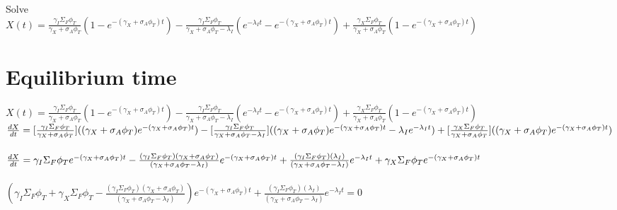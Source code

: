 \documentclass[11pt,a4paper]{article}
\begin{document}
\noindent Solve \\
$X(t)=\frac{\gamma_I\Sigma_F\phi_T}{\gamma_X+\sigma_A\phi_T}(1-e^{-(\gamma_X+\sigma_A\phi_T)t})-\frac{\gamma_I\Sigma_F\phi_T}{\gamma_X+\sigma_A\phi_T-\lambda_I}(e^{-\lambda_I t}-e^{-(\gamma_X+\sigma_A\phi_T)t})+\frac{\gamma_X\Sigma_F\phi_T}{\gamma_X+\sigma_A\phi_T}(1-e^{-(\gamma_X+\sigma_A\phi_T)t})$ \\

\newpage

\section{Equilibrium time}
$X(t)=\frac{\gamma_I\Sigma_F\phi_T}{\gamma_X+\sigma_A\phi_T}(1-e^{-(\gamma_X+\sigma_A\phi_T)t})-\frac{\gamma_I\Sigma_F\phi_T}{\gamma_X+\sigma_A\phi_T-\lambda_I}(e^{-\lambda_I t}-e^{-(\gamma_X+\sigma_A\phi_T)t})+\frac{\gamma_X\Sigma_F\phi_T}{\gamma_X+\sigma_A\phi_T}(1-e^{-(\gamma_X+\sigma_A\phi_T)t})$ \\

\noindent $\frac{dX}{dt}=[\frac{\gamma_I\Sigma_F\phi_T}{\gamma_X+\sigma_A\phi_T}]((\gamma_X+\sigma_A\phi_T)e^{-(\gamma_X+\sigma_A\phi_T)t})-[\frac{\gamma_I\Sigma_F\phi_T}{\gamma_X+\sigma_A\phi_T-\lambda_I}]((\gamma_X+\sigma_A\phi_T)e^{-(\gamma_X+\sigma_A\phi_T)t}-\lambda_Ie^{-\lambda_I t}) \\ +[\frac{\gamma_X\Sigma_F\phi_T}{\gamma_X+\sigma_A\phi_T}]((\gamma_X+\sigma_A\phi_T)e^{-(\gamma_X+\sigma_A\phi_T)t})$ \\ \\

\noindent $\frac{dX}{dt}=\gamma_I\Sigma_F\phi_T e^{-(\gamma_X+\sigma_A\phi_T)t} \\
-\frac{(\gamma_I\Sigma_F\phi_T)(\gamma_X+\sigma_A\phi_T)}{(\gamma_X+\sigma_A\phi_T-\lambda_I)}e^{-(\gamma_X+\sigma_A\phi_T)t} \\
+\frac{(\gamma_I\Sigma_F\phi_T)(\lambda_I)}{(\gamma_X+\sigma_A\phi_T-\lambda_I)}e^{-\lambda_I t} \\
+\gamma_X\Sigma_F\phi_T e^{-(\gamma_X+\sigma_A\phi_T)t}$ \\ \\

\noindent $(\gamma_I\Sigma_F\phi_T+\gamma_X\Sigma_F\phi_T-\frac{(\gamma_I\Sigma_F\phi_T)(\gamma_X+\sigma_A\phi_T)}{(\gamma_X+\sigma_A\phi_T-\lambda_I)})e^{-(\gamma_X+\sigma_A\phi_T)t}+\frac{(\gamma_I\Sigma_F\phi_T)(\lambda_I)}{(\gamma_X+\sigma_A\phi_T-\lambda_I)}e^{-\lambda_I t}=0$ \\
\end{document}
